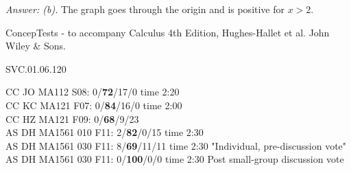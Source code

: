 {\it Answer: (b).} The graph goes through the origin and is positive for $x>2$.


\medskip
ConcepTests - to accompany Calculus 4th Edition, Hughes-Hallet et al. John Wiley \& Sons.

SVC.01.06.120

CC JO MA112 S08: 0/{\bf 72}/17/0 time 2:20 \\ 
CC KC MA121 F07: 0/{\bf 84}/16/0 time 2:00 \\
CC HZ MA121 F09: 0/{\bf68}/9/23  \\
AS DH MA1561 010 F11: 2/{\bf82}/0/15 time 2:30  \\
AS DH MA1561 030 F11: 8/{\bf69}/11/11 time 2:30 "Individual, pre-discussion vote" \\
AS DH MA1561 030 F11: 0/{\bf100}/0/0 time 2:30 Post small-group discussion vote \\
